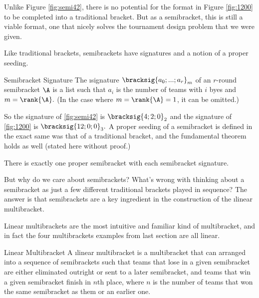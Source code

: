 {    

    Unlike Figure \ref{fig:semi42}, there is no potential for the format in Figure \ref{fig:1200} to be completed into a traditional bracket. But as a semibracket, this is still a viable format, one that nicely solves the tournament design problem that we were given.

    Like traditional brackets, semibrackets have signatures and a notion of a proper seeding.

    \begin{definition}{Semibracket Signature}{}
        The \i{signature} $\bracksig{a_0; ...; a_r}_m$ of an $r$-round semibracket $\A$ is a list such that $a_i$ is the number of teams with $i$ byes and $m = \rank{\A}.$ (In the case where $m = \rank{\A} = 1$, it can be omitted.)
    \end{definition}

    So the signature of \ref{fig:semi42} is $\bracksig{4;2;0}_2$ and the signature of \ref{fig:1200} is $\bracksig{12;0;0}_3.$ A proper seeding of a semibracket is defined in the exact same was that of a traditional bracket, and the fundamental theorem holds as well (stated here without proof.)

    \begin{theorem}{}{}
        There is exactly one proper semibracket with each semibracket signature.
    \end{theorem}

    But why do we care about semibrackets? What's wrong with thinking about a semibracket as just a few different traditional brackets played in sequence? The answer is that semibrackets are a key ingredient in the construction of the \i{linear multibracket}.

    Linear multibrackets are the most intuitive and familiar kind of multibracket, and in fact the four multibrackets examples from last section are all linear.

    \begin{definition}{Linear Multibracket}{}
        A \i{linear multibracket} is a multibracket that can arranged into a sequence of semibrackets such that teams that lose in a given semibracket are either eliminated outright or sent to a later semibracket, and teams that win a given semibracket finish in $n$th place, where $n$ is the number of teams that won the same semibracket as them or an earlier one.
    \end{definition}

    
















}